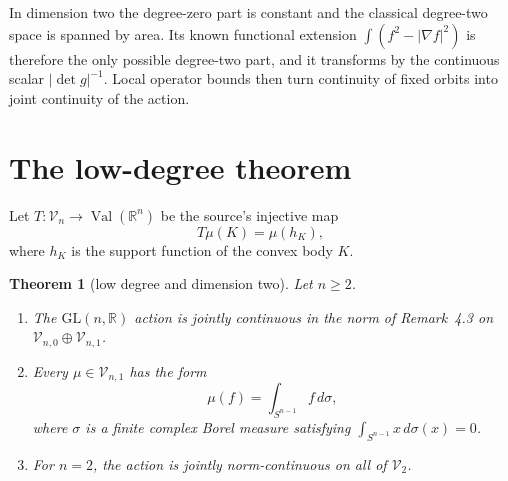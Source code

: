 \documentclass[11pt]{article}
\newtheorem{theorem}{Theorem}
\newcommand{\Val}{\operatorname{Val}}
\begin{document}
In dimension two the degree-zero part is constant and the classical
degree-two space is spanned by area.  Its known functional extension
$\int(f^2-|\nabla f|^2)$ is therefore the only possible degree-two part, and
it transforms by the continuous scalar $|\det g|^{-1}$.  Local operator
bounds then turn continuity of fixed orbits into joint continuity of the
action.

\section{The low-degree theorem}

Let $T:\mathcal V_n\to\Val(\mathbb R^n)$ be the source's injective map
\[
 T\mu(K)=\mu(h_K),
\]
where $h_K$ is the support function of the convex body $K$.

\begin{theorem}[low degree and dimension two]\label{thm:main}
Let $n\geq2$.
\begin{enumerate}
\item The $\mathrm{GL}(n,\mathbb R)$ action is jointly continuous in the norm
of Remark~4.3 on $\mathcal V_{n,0}\oplus\mathcal V_{n,1}$.
\item Every $\mu\in\mathcal V_{n,1}$ has the form
\[
 \mu(f)=\int_{S^{n-1}}f\,d\sigma,
\]
where $\sigma$ is a finite complex Borel measure satisfying
$\int_{S^{n-1}}x\,d\sigma(x)=0$.
\item For $n=2$, the action is jointly norm-continuous on all of
$\mathcal V_2$.
\end{enumerate}
\end{theorem}
\end{document}
